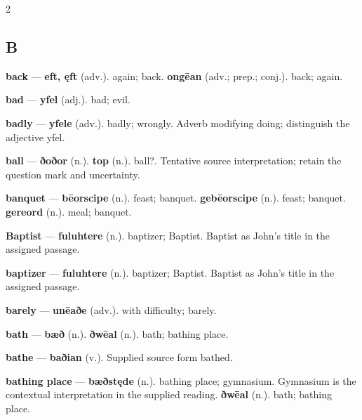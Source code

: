 \begin{multicols}{2}
\subsection*{B}
\textbf{back} — \textbf{eft, ęft} (adv.). again; back. \textbf{ongēan} (adv.; prep.; conj.). back; again.\par
\textbf{bad} — \textbf{yfel} (adj.). bad; evil.\par
\textbf{badly} — \textbf{yfele} (adv.). badly; wrongly. Adverb modifying doing; distinguish the adjective yfel.\par
\textbf{ball} — \textbf{ðoðor} (n.).  \textbf{top} (n.). ball?. Tentative source interpretation; retain the question mark and uncertainty.\par
\textbf{banquet} — \textbf{bēorscipe} (n.). feast; banquet. \textbf{gebēorscipe} (n.). feast; banquet. \textbf{gereord} (n.). meal; banquet.\par
\textbf{Baptist} — \textbf{fuluhtere} (n.). baptizer; Baptist. Baptist as John's title in the assigned passage.\par
\textbf{baptizer} — \textbf{fuluhtere} (n.). baptizer; Baptist. Baptist as John's title in the assigned passage.\par
\textbf{barely} — \textbf{unēaðe} (adv.). with difficulty; barely.\par
\textbf{bath} — \textbf{bæð} (n.).  \textbf{ðwēal} (n.). bath; bathing place.\par
\textbf{bathe} — \textbf{baðian} (v.). Supplied source form bathed.\par
\textbf{bathing place} — \textbf{bæðstęde} (n.). bathing place; gymnasium. Gymnasium is the contextual interpretation in the supplied reading. \textbf{ðwēal} (n.). bath; bathing place.\par

\end{multicols}
